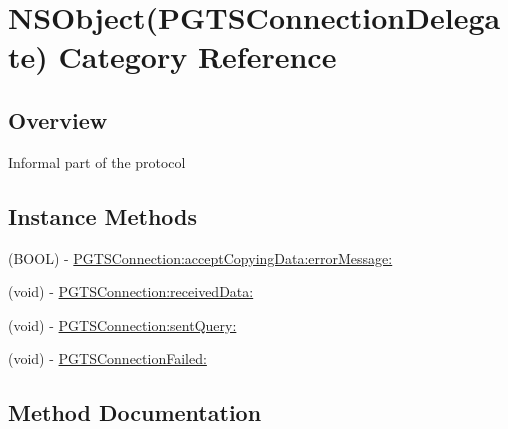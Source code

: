 \hypertarget{category_n_s_object_07_p_g_t_s_connection_delegate_08}{}\section{N\+S\+Object(P\+G\+T\+S\+Connection\+Delegate) Category Reference}
\label{category_n_s_object_07_p_g_t_s_connection_delegate_08}


\subsection{Overview}
Informal part of the protocol \subsection*{Instance Methods}
\begin{DoxyCompactItemize}
\item 
(B\+O\+O\+L) -\/ \hyperlink{category_n_s_object_07_p_g_t_s_connection_delegate_08_a73932b01af4b66858529b7fa2fb1d472}{P\+G\+T\+S\+Connection\+:accept\+Copying\+Data\+:error\+Message\+:}
\item 
(void) -\/ \hyperlink{category_n_s_object_07_p_g_t_s_connection_delegate_08_a3aa1e84dff6bf1b8b51df5b5fe170ec2}{P\+G\+T\+S\+Connection\+:received\+Data\+:}
\end{DoxyCompactItemize}
{\bf }\par
\begin{DoxyCompactItemize}
\item 
(void) -\/ \hyperlink{category_n_s_object_07_p_g_t_s_connection_delegate_08_a0eb6dd9539341369542501667eae4404}{P\+G\+T\+S\+Connection\+:sent\+Query\+:}
\end{DoxyCompactItemize}

{\bf }\par
\begin{DoxyCompactItemize}
\item 
(void) -\/ \hyperlink{category_n_s_object_07_p_g_t_s_connection_delegate_08_a81c05ade9eb102334036648372d51ae2}{P\+G\+T\+S\+Connection\+Failed\+:}
\end{DoxyCompactItemize}



\subsection{Method Documentation}
\hypertarget{category_n_s_object_07_p_g_t_s_connection_delegate_08_a73932b01af4b66858529b7fa2fb1d472}{}
